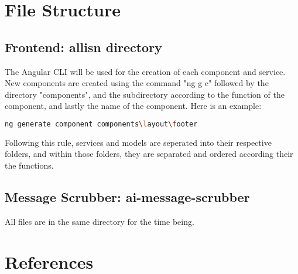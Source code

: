 \documentclass[11pt]{article}
\begin{document}

\section{File Structure}
\subsection{Frontend: allisn directory}

The Angular CLI will be used for the creation of each component and service. New components are created using the command "ng g c" followed by the directory "components", and the subdirectory according to the function of the component, and lastly the name of the component. Here is an example:

\begin{lstlisting}[language=bash]
ng generate component components\layout\footer
\end{lstlisting}
Following this rule, services and models are seperated into their respective folders, and within those folders, they are separated and ordered according their the functions.

\subsection{Message Scrubber: ai-message-scrubber}

All files are in the same directory for the time being.

\section{References}


\end{document}
